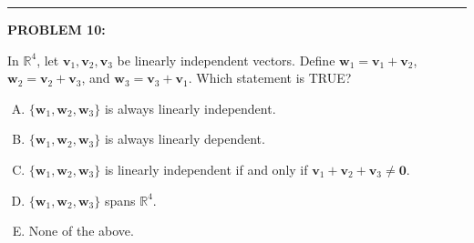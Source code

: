 \documentclass[12pt]{amsart}
\newcommand{\divider}{
  \vspace{-1em} %
  \noindent
  \raisebox{-0.15ex}{\textbullet}%
  \hspace{0.5em}%
  \rule[0.5ex]{0.95\textwidth}{1.0pt}%
  \hspace{0.5em}%
  \raisebox{-0.15ex}{\textbullet}%
  \vspace{0em} %
}
\begin{document}

\divider

\newpage

{\bf PROBLEM 10:}

In $\mathbb{R}^4$, let $\mathbf{v}_1, \mathbf{v}_2, \mathbf{v}_3$ be linearly independent vectors. Define $\mathbf{w}_1 = \mathbf{v}_1 + \mathbf{v}_2$, $\mathbf{w}_2 = \mathbf{v}_2 + \mathbf{v}_3$, and $\mathbf{w}_3 = \mathbf{v}_3 + \mathbf{v}_1$. Which statement is TRUE?

\begin{enumerate}[(A)]
\item $\{\mathbf{w}_1, \mathbf{w}_2, \mathbf{w}_3\}$ is always linearly independent.
\item $\{\mathbf{w}_1, \mathbf{w}_2, \mathbf{w}_3\}$ is always linearly dependent.
\item $\{\mathbf{w}_1, \mathbf{w}_2, \mathbf{w}_3\}$ is linearly independent if and only if $\mathbf{v}_1 + \mathbf{v}_2 + \mathbf{v}_3 \neq \mathbf{0}$.
\item $\{\mathbf{w}_1, \mathbf{w}_2, \mathbf{w}_3\}$ spans $\mathbb{R}^4$.
\item None of the above.
\end{enumerate}
\end{document}

